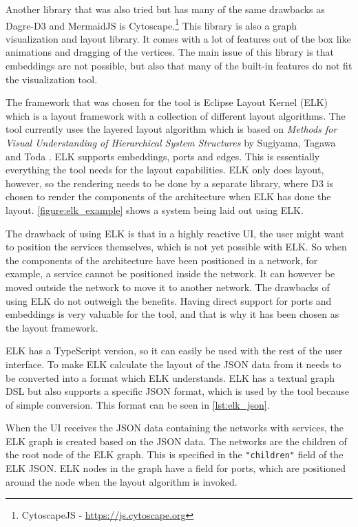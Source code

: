 Another library that was also tried but has many of the same drawbacks as Dagre-D3 and MermaidJS is Cytoscape.\footnote{CytoscapeJS - \url{https://js.cytoscape.org}}
This library is also a graph visualization and layout library. It comes with a lot of features out of the box like animations and dragging of the vertices. The main issue of this library is that embeddings are
not possible, but also that many of the built-in features do not fit the visualization tool.

The framework that was chosen for the tool is Eclipse Layout Kernel (ELK) \cite{ELK}
which is a layout framework with a collection of different layout algorithms. The tool currently uses the layered layout algorithm which is based on \emph{Methods for Visual Understanding of Hierarchical System Structures} by Sugiyama, Tagawa and Toda \cite{4308636}. ELK supports embeddings, ports and edges. This is essentially everything the tool needs for the layout capabilities.
ELK only does layout, however, so the rendering needs to be done by a separate library, where D3 is chosen to render the components of the architecture when ELK has done the layout.
\cref{figure:elk_example} shows a system being laid out using ELK.

The drawback of using ELK is that in a highly reactive UI, the user might want to position the services themselves, which is not yet possible with ELK.
So when the components of the architecture have been positioned in a network, for example, a service cannot be positioned inside the network. It can however be moved outside the network to move it to another network.
The drawbacks of using ELK do not outweigh the benefits. Having direct support for ports and embeddings is very valuable for the tool, and that is why it has been chosen as the layout framework.

ELK has a TypeScript version, so it can easily be used with the rest of the user interface. To make ELK calculate the layout of the JSON data from \javatoolname[] it needs to be converted into a format which ELK understands.
ELK has a textual graph DSL but also supports a specific JSON format, which is used by the tool because of simple conversion. This format can be seen in \cref{lst:elk_json}.

When the UI receives the JSON data containing the networks with services, the ELK graph is created based on the JSON data.
The networks are the children of the root node of the ELK graph. This is specified in the \texttt{"children"} field of the ELK JSON.
ELK nodes in the graph have a field for ports, which are positioned around the node when the layout algorithm is invoked.

